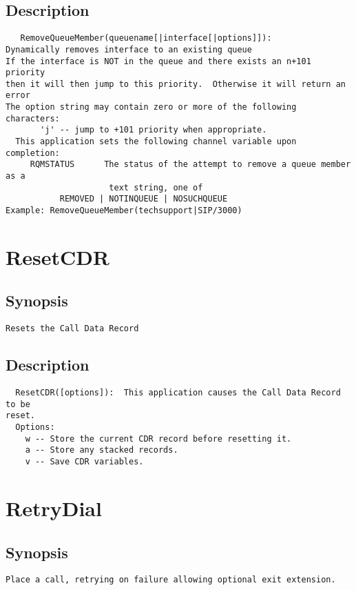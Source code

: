 \subsection{Description}
\begin{verbatim}
   RemoveQueueMember(queuename[|interface[|options]]):
Dynamically removes interface to an existing queue
If the interface is NOT in the queue and there exists an n+101 priority
then it will then jump to this priority.  Otherwise it will return an error
The option string may contain zero or more of the following characters:
       'j' -- jump to +101 priority when appropriate.
  This application sets the following channel variable upon completion:
     RQMSTATUS      The status of the attempt to remove a queue member as a
                     text string, one of
           REMOVED | NOTINQUEUE | NOSUCHQUEUE 
Example: RemoveQueueMember(techsupport|SIP/3000)

\end{verbatim}


\section{ResetCDR}
\subsection{Synopsis}
\begin{verbatim}
Resets the Call Data Record
\end{verbatim}
\subsection{Description}
\begin{verbatim}
  ResetCDR([options]):  This application causes the Call Data Record to be
reset.
  Options:
    w -- Store the current CDR record before resetting it.
    a -- Store any stacked records.
    v -- Save CDR variables.

\end{verbatim}


\section{RetryDial}
\subsection{Synopsis}
\begin{verbatim}
Place a call, retrying on failure allowing optional exit extension.
\end{verbatim}
